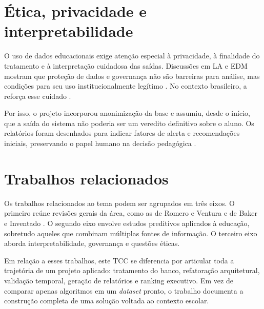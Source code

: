 \section{\'Etica, privacidade e interpretabilidade}
\label{sec:etica}

O uso de dados educacionais exige aten\c{c}\~ao especial \`a privacidade, \`a finalidade do tratamento e \`a interpreta\c{c}\~ao cuidadosa das sa\'idas. Discuss\~oes em LA e EDM mostram que prote\c{c}\~ao de dados e governan\c{c}a n\~ao s\~ao barreiras para an\'alise, mas condi\c{c}\~oes para seu uso institucionalmente leg\'itimo \cite{slade2013, gasevic2016, khalil2016}. No contexto brasileiro, a  refor\c{c}a esse cuidado \cite{lgpd}.

Por isso, o projeto incorporou anonimiza\c{c}\~ao da base e assumiu, desde o in\'icio, que a sa\'ida do sistema n\~ao poderia ser um veredito definitivo sobre o aluno. Os relat\'orios foram desenhados para indicar fatores de alerta e recomenda\c{c}\~oes iniciais, preservando o papel humano na decis\~ao pedag\'ogica \cite{fiok2022}.

\section{Trabalhos relacionados}
\label{sec:relacionados}

Os trabalhos relacionados ao tema podem ser agrupados em tr\^es eixos. O primeiro re\'une revis\~oes gerais da \'area, como as de Romero e Ventura \cite{romero2010} e de Baker e Inventado \cite{baker2014}. O segundo eixo envolve estudos preditivos aplicados \`a educa\c{c}\~ao, sobretudo aqueles que combinam m\'ultiplas fontes de informa\c{c}\~ao. O terceiro eixo aborda interpretabilidade, governan\c{c}a e quest\~oes \'eticas.

Em rela\c{c}\~ao a esses trabalhos, este TCC se diferencia por articular toda a trajet\'oria de um projeto aplicado: tratamento do banco, refatora\c{c}\~ao arquitetural, valida\c{c}\~ao temporal, gera\c{c}\~ao de relat\'orios e ranking executivo. Em vez de comparar apenas algoritmos em um \textit{dataset} pronto, o trabalho documenta a constru\c{c}\~ao completa de uma solu\c{c}\~ao voltada ao contexto escolar.
